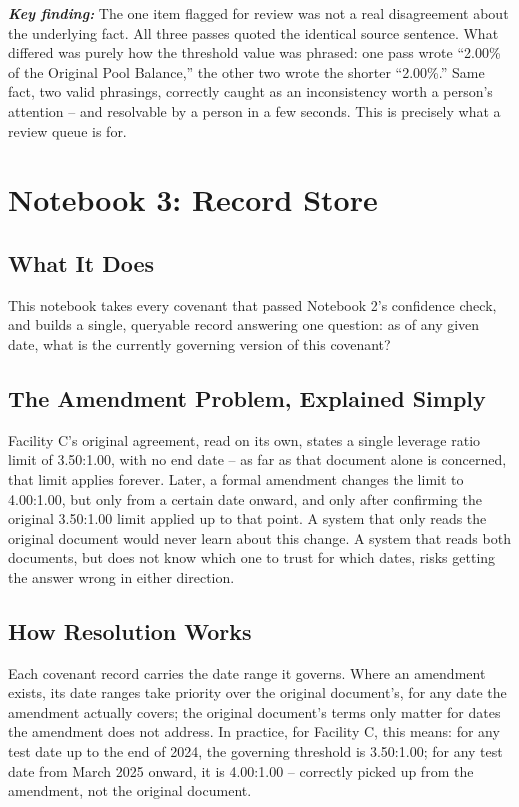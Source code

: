 \documentclass[11pt,a4paper]{article}
\newcommand{\keyfinding}[1]{%
  \begin{tcolorbox}[colback=white, colframe=black, boxrule=0.6pt, arc=1pt, left=8pt, right=8pt, top=6pt, bottom=6pt]
  \textbf{\textit{Key finding:}} #1
  \end{tcolorbox}
}
\begin{document}
\keyfinding{The one item flagged for review was not a real disagreement about the underlying fact. All three passes quoted the identical source sentence. What differed was purely how the threshold value was phrased: one pass wrote ``2.00\% of the Original Pool Balance,'' the other two wrote the shorter ``2.00\%.'' Same fact, two valid phrasings, correctly caught as an inconsistency worth a person's attention -- and resolvable by a person in a few seconds. This is precisely what a review queue is for.}

\newpage
\section{Notebook 3: Record Store}

\subsection{What It Does}

This notebook takes every covenant that passed Notebook 2's confidence check, and builds a single, queryable record answering one question: as of any given date, what is the currently governing version of this covenant?

\subsection{The Amendment Problem, Explained Simply}

Facility C's original agreement, read on its own, states a single leverage ratio limit of 3.50:1.00, with no end date -- as far as that document alone is concerned, that limit applies forever. Later, a formal amendment changes the limit to 4.00:1.00, but only from a certain date onward, and only after confirming the original 3.50:1.00 limit applied up to that point. A system that only reads the original document would never learn about this change. A system that reads both documents, but does not know which one to trust for which dates, risks getting the answer wrong in either direction.

\subsection{How Resolution Works}

Each covenant record carries the date range it governs. Where an amendment exists, its date ranges take priority over the original document's, for any date the amendment actually covers; the original document's terms only matter for dates the amendment does not address. In practice, for Facility C, this means: for any test date up to the end of 2024, the governing threshold is 3.50:1.00; for any test date from March 2025 onward, it is 4.00:1.00 -- correctly picked up from the amendment, not the original document.
\end{document}
